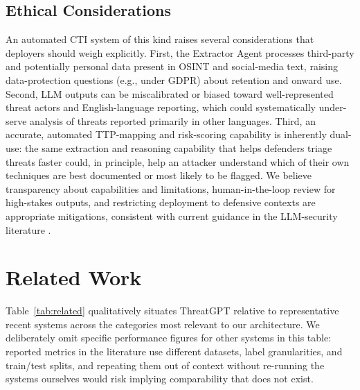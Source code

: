 \documentclass[runningheads]{llncs}
\begin{document}
\subsection{Ethical Considerations}

An automated CTI system of this kind raises several considerations that deployers should weigh explicitly. First, the Extractor Agent processes third-party and potentially personal data present in OSINT and social-media text, raising data-protection questions (e.g., under GDPR) about retention and onward use. Second, LLM outputs can be miscalibrated or biased toward well-represented threat actors and English-language reporting, which could systematically under-serve analysis of threats reported primarily in other languages. Third, an accurate, automated TTP-mapping and risk-scoring capability is inherently dual-use: the same extraction and reasoning capability that helps defenders triage threats faster could, in principle, help an attacker understand which of their own techniques are best documented or most likely to be flagged. We believe transparency about capabilities and limitations, human-in-the-loop review for high-stakes outputs, and restricting deployment to defensive contexts are appropriate mitigations, consistent with current guidance in the LLM-security literature \cite{promptinjectionreview2026}.

\section{Related Work}
\label{sec:related}

Table~\ref{tab:related} qualitatively situates ThreatGPT relative to representative recent systems across the categories most relevant to our architecture. We deliberately omit specific performance figures for other systems in this table: reported metrics in the literature use different datasets, label granularities, and train/test splits, and repeating them out of context without re-running the systems ourselves would risk implying comparability that does not exist.
\end{document}
